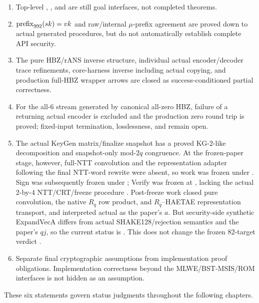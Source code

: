 \begin{enumerate}
  \item Top-level , , and
         are still goal interfaces, not completed theorems.
  \item \(\mathop{\mathrm{prefix}}_{992}(sk)=vk\) and raw/internal \(\mu\)-prefix agreement
        are proved down to actual generated procedures, but do not automatically
        establish complete API security.
  \item The pure HBZ/rANS inverse structure, individual actual encoder/decoder
        trace refinements, core-harness inverse including actual copying,
        and production full-HBZ wrapper arrows are closed as
        success-conditioned partial correctness.
  \item For the all-6 stream generated by canonical all-zero HBZ, failure of a
        returning actual encoder is excluded and the production zero round
        trip is proved; fixed-input termination, losslessness, and
         remain open.
  \item The actual KeyGen matrix/finalize snapshot has a proved KG-2-like
        decomposition and snapshot-only mod-\(2q\) congruence. At the frozen-paper
        stage, however, full-NTT convolution and the representation adapter
        following the final  NTT-word rewrite were
        absent, so work was frozen under .
        Sign was subsequently frozen under ;
        Verify was frozen at \FrozenPaperGate, lacking the actual 2-by-4
        NTT/CRT/freeze procedure
        \cite{week16-sign-report,week16-verify-report}.
        Post-freeze work closed pure convolution, the native \(R_q\) row
        product, and \(R_q\)--HAETAE representation transport, and interpreted
        actual  as the paper's \(a\).
        But security-side synthetic ExpandVecA differs from actual
        SHAKE128/rejection semantics and the paper's \(qj\), so the current
        status is \CurrentGate. This does not change the frozen 82-target
        verdict \cite{post-freeze-kg-rq-haetae-report,
        post-freeze-kg-actual-avec-qj-report,paper-freeze-artifacts}.
  \item Separate final cryptographic assumptions from implementation proof
        obligations. Implementation correctness beyond the MLWE/BST-MSIS/ROM
        interfaces is not hidden as an assumption.
\end{enumerate}

These six statements govern status judgments throughout the following chapters.
